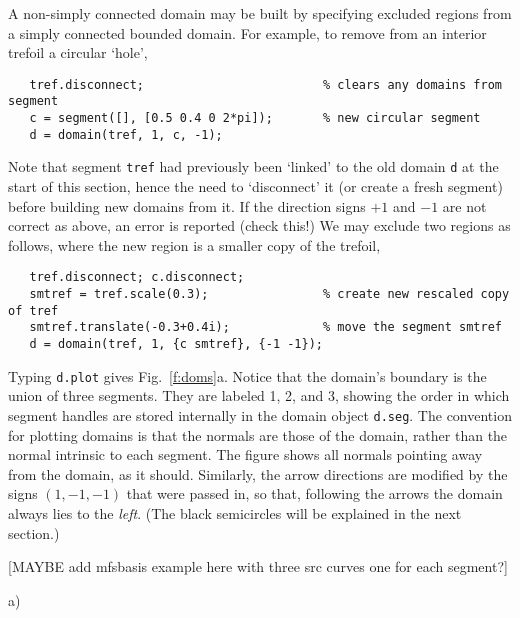 \documentclass[11pt]{article}
\begin{document}
A non-simply connected domain may be built by specifying excluded
regions from a simply connected bounded domain. For example,
to remove from an interior trefoil a circular `hole',
\begin{verbatim}
   tref.disconnect;                         % clears any domains from segment
   c = segment([], [0.5 0.4 0 2*pi]);       % new circular segment
   d = domain(tref, 1, c, -1);
\end{verbatim}
Note that segment {\tt tref} had previously
been `linked' to the old domain {\tt d}
at the start of this section, hence the need to `disconnect' it
(or create a fresh segment) before
building new domains from it. 
If the direction signs $+1$ and $-1$ are not correct as above, an
error is reported (check this!)
We may exclude two regions as follows, where the new region is a smaller copy
of the trefoil,
\begin{verbatim}
   tref.disconnect; c.disconnect;
   smtref = tref.scale(0.3);                % create new rescaled copy of tref
   smtref.translate(-0.3+0.4i);             % move the segment smtref
   d = domain(tref, 1, {c smtref}, {-1 -1});
\end{verbatim}
Typing {\tt d.plot} gives Fig.~\ref{f:doms}a. Notice that
the domain's boundary is the union of three segments. They are labeled
1, 2, and 3, showing the order in which segment handles
are stored internally in the domain object {\tt d.seg}.
The convention for plotting domains is that the normals
are those of the domain, rather than the normal intrinsic to each segment.
The figure shows all normals pointing away from the domain, as it should.
Similarly, the arrow directions are modified by the signs $(1,-1,-1)$ that
were passed in, so that, following the arrows the domain always lies to
the {\em left}. (The black semicircles will be explained in the next section.)


[MAYBE add mfsbasis example here with three src curves one for each segment?]

\vspace{10ex}



\bfi %
a)
\efi
\end{document}
